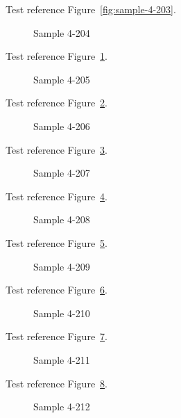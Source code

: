 Test reference Figure~\ref{fig:sample-4-203}.

\begin{figure}[tbhp]
\caption{Sample 4-204}
\label{fig:sample-4-204}
\end{figure}

Test reference Figure~\ref{fig:sample-4-204}.

\begin{figure}[tbhp]
\caption{Sample 4-205}
\label{fig:sample-4-205}
\end{figure}

Test reference Figure~\ref{fig:sample-4-205}.

\begin{figure}[tbhp]
\caption{Sample 4-206}
\label{fig:sample-4-206}
\end{figure}

Test reference Figure~\ref{fig:sample-4-206}.

\begin{figure}[tbhp]
\caption{Sample 4-207}
\label{fig:sample-4-207}
\end{figure}

Test reference Figure~\ref{fig:sample-4-207}.

\begin{figure}[tbhp]
\caption{Sample 4-208}
\label{fig:sample-4-208}
\end{figure}

Test reference Figure~\ref{fig:sample-4-208}.

\begin{figure}[tbhp]
\caption{Sample 4-209}
\label{fig:sample-4-209}
\end{figure}

Test reference Figure~\ref{fig:sample-4-209}.

\begin{figure}[tbhp]
\caption{Sample 4-210}
\label{fig:sample-4-210}
\end{figure}

Test reference Figure~\ref{fig:sample-4-210}.

\begin{figure}[tbhp]
\caption{Sample 4-211}
\label{fig:sample-4-211}
\end{figure}

Test reference Figure~\ref{fig:sample-4-211}.

\begin{figure}[tbhp]
\caption{Sample 4-212}
\label{fig:sample-4-212}
\end{figure}

